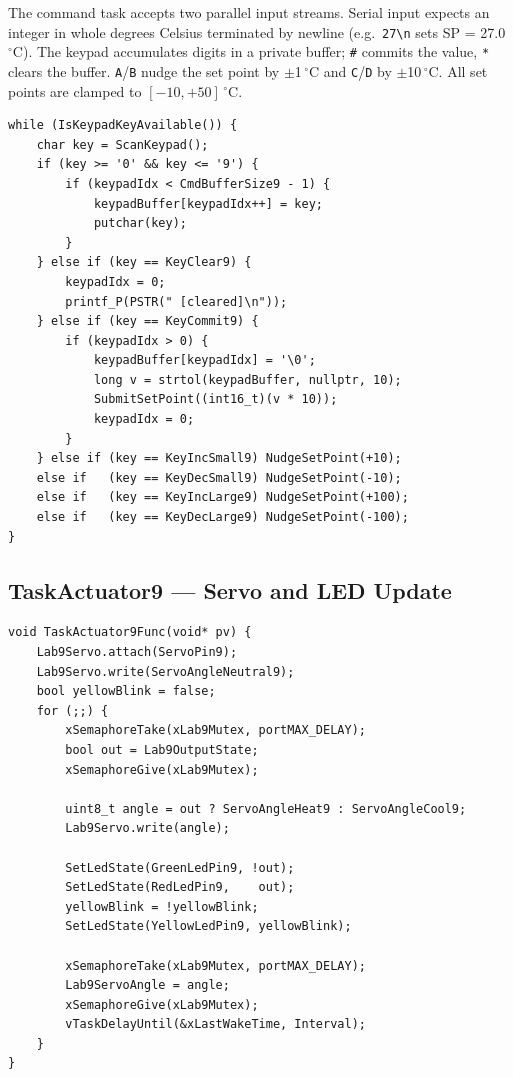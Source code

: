 \documentclass[12pt]{article}
\begin{document}
The command task accepts two parallel input streams. Serial input expects an integer in whole degrees Celsius terminated by newline (e.g.\ \texttt{27\textbackslash n} sets SP = 27.0\,$^{\circ}$C). The keypad accumulates digits in a private buffer; \texttt{\#} commits the value, \texttt{*} clears the buffer. \texttt{A}/\texttt{B} nudge the set point by $\pm$1\,$^{\circ}$C and \texttt{C}/\texttt{D} by $\pm$10\,$^{\circ}$C. All set points are clamped to $[-10, +50]\,^{\circ}$C.

\begin{lstlisting}[caption={TaskCommandRead9 --- keypad processing}]
while (IsKeypadKeyAvailable()) {
    char key = ScanKeypad();
    if (key >= '0' && key <= '9') {
        if (keypadIdx < CmdBufferSize9 - 1) {
            keypadBuffer[keypadIdx++] = key;
            putchar(key);
        }
    } else if (key == KeyClear9) {
        keypadIdx = 0;
        printf_P(PSTR(" [cleared]\n"));
    } else if (key == KeyCommit9) {
        if (keypadIdx > 0) {
            keypadBuffer[keypadIdx] = '\0';
            long v = strtol(keypadBuffer, nullptr, 10);
            SubmitSetPoint((int16_t)(v * 10));
            keypadIdx = 0;
        }
    } else if (key == KeyIncSmall9) NudgeSetPoint(+10);
    else if   (key == KeyDecSmall9) NudgeSetPoint(-10);
    else if   (key == KeyIncLarge9) NudgeSetPoint(+100);
    else if   (key == KeyDecLarge9) NudgeSetPoint(-100);
}
\end{lstlisting}

\subsection{TaskActuator9 --- Servo and LED Update}

\begin{lstlisting}[caption={TaskActuator9 --- drive servo and update LEDs}]
void TaskActuator9Func(void* pv) {
    Lab9Servo.attach(ServoPin9);
    Lab9Servo.write(ServoAngleNeutral9);
    bool yellowBlink = false;
    for (;;) {
        xSemaphoreTake(xLab9Mutex, portMAX_DELAY);
        bool out = Lab9OutputState;
        xSemaphoreGive(xLab9Mutex);

        uint8_t angle = out ? ServoAngleHeat9 : ServoAngleCool9;
        Lab9Servo.write(angle);

        SetLedState(GreenLedPin9, !out);
        SetLedState(RedLedPin9,    out);
        yellowBlink = !yellowBlink;
        SetLedState(YellowLedPin9, yellowBlink);

        xSemaphoreTake(xLab9Mutex, portMAX_DELAY);
        Lab9ServoAngle = angle;
        xSemaphoreGive(xLab9Mutex);
        vTaskDelayUntil(&xLastWakeTime, Interval);
    }
}
\end{lstlisting}
\end{document}
